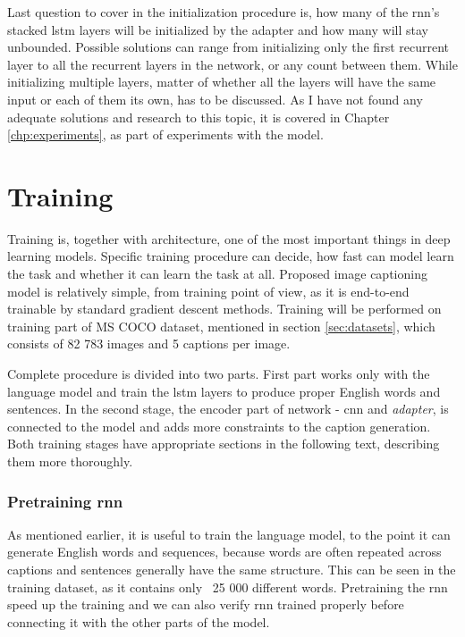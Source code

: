 Last question to cover in the initialization procedure is, how many of the \gls{rnn}'s stacked \gls{lstm} layers will be initialized by the adapter and how many will stay unbounded. Possible solutions can range from initializing only the first recurrent layer to all the recurrent layers in the network, or any count between them. While initializing multiple layers, matter of whether all the layers will have the same input or each of them its own, has to be discussed. As I have not found any adequate solutions and research to this topic, it is covered in Chapter \ref{chp:experiments}, as part of experiments with the model. 

\section{Training} \label{sec:training}

Training is, together with architecture, one of the most important things in deep learning models. Specific training procedure can decide, how fast can model learn the task and whether it can learn the task at all. Proposed image captioning model is relatively simple, from training point of view, as it is end-to-end trainable by standard gradient descent methods. Training will be performed on training part of MS COCO dataset, mentioned in section \ref{sec:datasets}, which consists of 82 783 images and 5 captions per image.

Complete procedure is divided into two parts. First part works only with the language model and train the \gls{lstm} layers to produce proper English words and sentences. In the second stage, the encoder part of network - \gls{cnn} and \emph{adapter}, is connected to the model and adds more constraints to the caption generation. Both training stages have appropriate sections in the following text, describing them more thoroughly.

\subsubsection{Pretraining \gls{rnn}}

As mentioned earlier, it is useful to train the language model, to the point it can generate English words and sequences, because words are often repeated across captions and sentences generally have the same structure. This can be seen in the training dataset, as it contains only ~25 000 different words. Pretraining the \gls{rnn} speed up the training and we can also verify \gls{rnn} trained properly before connecting it with the other parts of the model.


